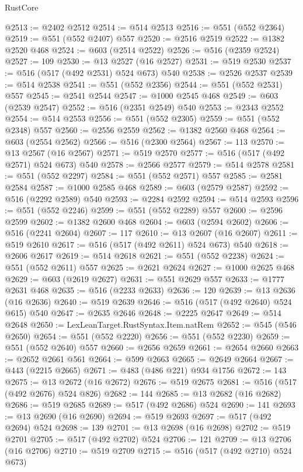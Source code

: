 \begin{lexlean}{RustCore}
\begin{coremodule}
@2513 := @2402 @2512
@2514 := @514 @2513
@2516 := @551 (@552 @2364)
@2519 := @551 (@552 @2407) @557
@2520 := @2516 @2519
@2522 := @1382 @2520 @468
@2524 := @603 (@2514 @2522)
@2526 := @516 (@2359 @2524)
@2527 := 109
@2530 := @13 @2527 (@16 @2527)
@2531 := @519 @2530
@2537 := @516 (@517 (@492 @2531) @524 @673) @540
@2538 := @2526 @2537
@2539 := @514 @2538
@2541 := @551 (@552 @2356)
@2544 := @551 (@552 @2531) @557
@2545 := @2541 @2544
@2547 := @1000 @2545 @468
@2549 := @603 (@2539 @2547)
@2552 := @516 (@2351 @2549) @540
@2553 := @2343 @2552
@2554 := @514 @2553
@2556 := @551 (@552 @2305)
@2559 := @551 (@552 @2348) @557
@2560 := @2556 @2559
@2562 := @1382 @2560 @468
@2564 := @603 (@2554 @2562)
@2566 := @516 (@2300 @2564)
@2567 := 113
@2570 := @13 @2567 (@16 @2567)
@2571 := @519 @2570
@2577 := @516 (@517 (@492 @2571) @524 @673) @540
@2578 := @2566 @2577
@2579 := @514 @2578
@2581 := @551 (@552 @2297)
@2584 := @551 (@552 @2571) @557
@2585 := @2581 @2584
@2587 := @1000 @2585 @468
@2589 := @603 (@2579 @2587)
@2592 := @516 (@2292 @2589) @540
@2593 := @2284 @2592
@2594 := @514 @2593
@2596 := @551 (@552 @2246)
@2599 := @551 (@552 @2289) @557
@2600 := @2596 @2599
@2602 := @1382 @2600 @468
@2604 := @603 (@2594 @2602)
@2606 := @516 (@2241 @2604)
@2607 := 117
@2610 := @13 @2607 (@16 @2607)
@2611 := @519 @2610
@2617 := @516 (@517 (@492 @2611) @524 @673) @540
@2618 := @2606 @2617
@2619 := @514 @2618
@2621 := @551 (@552 @2238)
@2624 := @551 (@552 @2611) @557
@2625 := @2621 @2624
@2627 := @1000 @2625 @468
@2629 := @603 (@2619 @2627)
@2631 := @551 @2629 @557
@2633 := @1777 @2631 @468
@2635 := @516 (@2233 @2633)
@2636 := 120
@2639 := @13 @2636 (@16 @2636)
@2640 := @519 @2639
@2646 := @516 (@517 (@492 @2640) @524 @615) @540
@2647 := @2635 @2646
@2648 := @2225 @2647
@2649 := @514 @2648
@2650 := LexLeanTarget.RustSyntax.Item.natRem
@2652 := @545 (@546 @2650)
@2654 := @551 (@552 @2220)
@2656 := @551 (@552 @2230)
@2659 := @551 (@552 @2640) @557
@2660 := @2656 @2659
@2661 := @2654 @2660
@2663 := @2652 @2661 @561
@2664 := @599 @2663
@2665 := @2649 @2664
@2667 := @443 (@2215 @2665)
@2671 := @483 (@486 @221) @934 @1756
@2672 := 143
@2675 := @13 @2672 (@16 @2672)
@2676 := @519 @2675
@2681 := @516 (@517 (@492 @2676) @524 @826)
@2682 := 144
@2685 := @13 @2682 (@16 @2682)
@2686 := @519 @2685
@2689 := @517 (@492 @2686) @524
@2690 := 141
@2693 := @13 @2690 (@16 @2690)
@2694 := @519 @2693
@2697 := @517 (@492 @2694) @524
@2698 := 139
@2701 := @13 @2698 (@16 @2698)
@2702 := @519 @2701
@2705 := @517 (@492 @2702) @524
@2706 := 121
@2709 := @13 @2706 (@16 @2706)
@2710 := @519 @2709
@2715 := @516 (@517 (@492 @2710) @524 @673)

\end{coremodule}
\end{lexlean}
